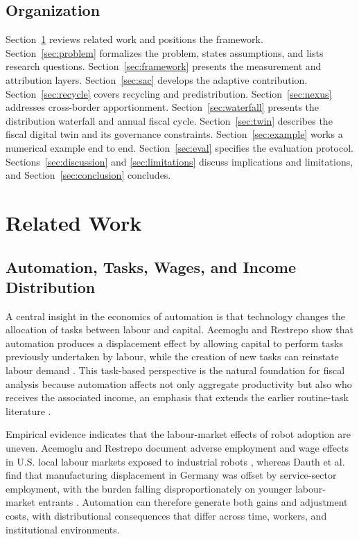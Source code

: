 \documentclass[journal]{IEEEtran}
\theoremstyle{plain}
\theoremstyle{definition}
\begin{document}
\subsection{Organization}

Section~\ref{sec:related} reviews related work and positions the framework. Section~\ref{sec:problem} formalizes the problem, states assumptions, and lists research questions. Section~\ref{sec:framework} presents the measurement and attribution layers. Section~\ref{sec:sac} develops the adaptive contribution. Section~\ref{sec:recycle} covers recycling and predistribution. Section~\ref{sec:nexus} addresses cross-border apportionment. Section~\ref{sec:waterfall} presents the distribution waterfall and annual fiscal cycle. Section~\ref{sec:twin} describes the fiscal digital twin and its governance constraints. Section~\ref{sec:example} works a numerical example end to end. Section~\ref{sec:eval} specifies the evaluation protocol. Sections~\ref{sec:discussion} and \ref{sec:limitations} discuss implications and limitations, and Section~\ref{sec:conclusion} concludes.

\section{Related Work}
\label{sec:related}

\subsection{Automation, Tasks, Wages, and Income Distribution}

A central insight in the economics of automation is that technology changes the allocation of tasks between labour and capital. Acemoglu and Restrepo show that automation produces a displacement effect by allowing capital to perform tasks previously undertaken by labour, while the creation of new tasks can reinstate labour demand \cite{AcemogluRestrepo2019}. This task-based perspective is the natural foundation for fiscal analysis because automation affects not only aggregate productivity but also who receives the associated income, an emphasis that extends the earlier routine-task literature \cite{AutorLevyMurnane2003}.

Empirical evidence indicates that the labour-market effects of robot adoption are uneven. Acemoglu and Restrepo document adverse employment and wage effects in U.S. local labour markets exposed to industrial robots \cite{AcemogluRestrepo2020}, whereas Dauth et al. find that manufacturing displacement in Germany was offset by service-sector employment, with the burden falling disproportionately on younger labour-market entrants \cite{Dauth2021}. Automation can therefore generate both gains and adjustment costs, with distributional consequences that differ across time, workers, and institutional environments.
\end{document}
